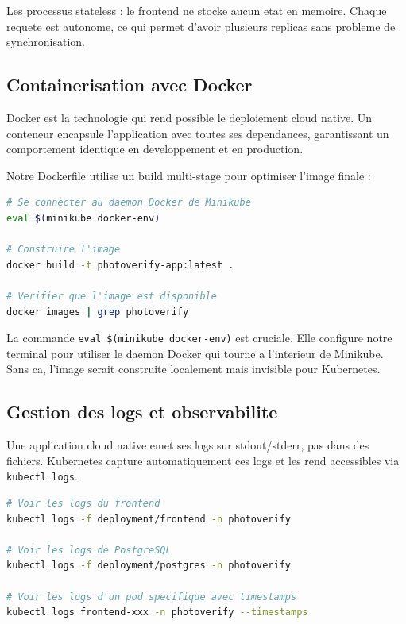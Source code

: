 \documentclass[12pt,a4paper]{article}
\begin{document}
Les processus stateless : le frontend ne stocke aucun etat en memoire. Chaque requete est autonome, ce qui permet d'avoir plusieurs replicas sans probleme de synchronisation.

\subsection{Containerisation avec Docker}

Docker est la technologie qui rend possible le deploiement cloud native. Un conteneur encapsule l'application avec toutes ses dependances, garantissant un comportement identique en developpement et en production.

Notre Dockerfile utilise un build multi-stage pour optimiser l'image finale :

\begin{lstlisting}[language=bash, caption={Build de l'image Docker}]
# Se connecter au daemon Docker de Minikube
eval $(minikube docker-env)

# Construire l'image
docker build -t photoverify-app:latest .

# Verifier que l'image est disponible
docker images | grep photoverify
\end{lstlisting}

La commande \texttt{eval \$(minikube docker-env)} est cruciale. Elle configure notre terminal pour utiliser le daemon Docker qui tourne a l'interieur de Minikube. Sans ca, l'image serait construite localement mais invisible pour Kubernetes.

\subsection{Gestion des logs et observabilite}

Une application cloud native emet ses logs sur stdout/stderr, pas dans des fichiers. Kubernetes capture automatiquement ces logs et les rend accessibles via \texttt{kubectl logs}.

\begin{lstlisting}[language=bash, caption={Consultation des logs applicatifs}]
# Voir les logs du frontend
kubectl logs -f deployment/frontend -n photoverify

# Voir les logs de PostgreSQL
kubectl logs -f deployment/postgres -n photoverify

# Voir les logs d'un pod specifique avec timestamps
kubectl logs frontend-xxx -n photoverify --timestamps
\end{lstlisting}
\end{document}
